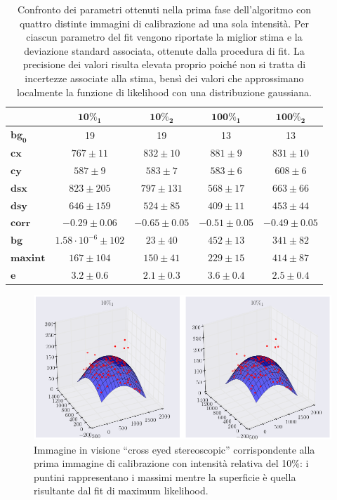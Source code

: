 \begin{table}
 \begin{center}
\begin{small}
\begin{tabular}{lcccc}
\hline\hline
&$\mathbf{10\%_1}$&$\mathbf{10\%_2}$&$\mathbf{100\%_1}$&$\mathbf{100\%_2}$\\
\hline
$\mathbf{bg_0}$& 19 & 19 & 13 & 13\\
\hline
$\mathbf{cx}$&$767\pm11$&$832\pm10$&$881\pm9$&$831\pm10$\\
$\mathbf{cy}$&$587\pm9$&$583\pm7$&$583\pm6 $&$608\pm6$\\
$\mathbf{dsx}$&$823\pm205$&$ 797\pm131$&$568 \pm17$&$663\pm66$\\
$\mathbf{dsy}$&$646\pm159$&$524\pm85$&$ 409\pm11$&$453\pm44$\\
$\mathbf{corr}$&$-0.29\pm0.06$&$-0.65\pm0.05 $&$-0.51\pm0.05$&$-0.49\pm0.05$\\
$\mathbf{bg}$&$1.58\cdot 10^{-6}\pm102$&$23\pm40 $&$452\pm13$&$341\pm82$\\
$\mathbf{maxint}$&$167\pm104$&$150\pm41$&$229\pm15$&$414\pm87$\\
$\mathbf{e}$&$3.2\pm0.6$&$2.1\pm0.3$&$3.6\pm0.4$&$2.5\pm0.4$\\
\hline\hline
\end{tabular}
\caption{\small{Confronto dei parametri ottenuti nella prima fase dell'algoritmo con quattro distinte immagini di calibrazione ad una sola intensità. Per ciascun parametro del fit vengono riportate la miglior stima e la deviazione standard associata, ottenute dalla procedura di fit. La precisione dei valori risulta elevata proprio poiché non si tratta di incertezze associate alla stima, bensì dei valori che approssimano localmente la funzione di likelihood con una distribuzione gaussiana.}}
\label{TABris}
\end{small}
\end{center}
\end{table}

\clearpage

\begin{figure}
 \centering
 \includegraphics[scale=.45]{img/CAP4gauss1.png}
 \caption{\small{Immagine in visione ``cross eyed stereoscopic'' corrispondente alla prima immagine di calibrazione con intensità relativa del 10\%: i puntini rappresentano i massimi mentre la superficie è quella risultante dal fit di maximum likelihood.}}
 \label{fig:gauss1}
\end{figure}

